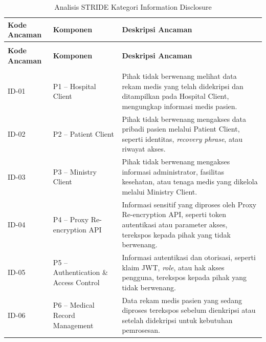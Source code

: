 \begin{xltabular}{\textwidth}{|>{\centering\arraybackslash}p{1.8cm}|>{\raggedright\arraybackslash}p{3.2cm}|X|}
    \caption{Analisis STRIDE Kategori Information Disclosure}
    \label{tab:stride-information-disclosure} \\
    \hline
    \textbf{Kode Ancaman} &
    \textbf{Komponen} &
    \textbf{Deskripsi Ancaman} \\
    \hline
    \endfirsthead

    {} \\
    \hline
    \textbf{Kode Ancaman} &
    \textbf{Komponen} &
    \textbf{Deskripsi Ancaman} \\
    \hline
    \endhead

    \hline
     \\
    \endfoot

    \hline
    \endlastfoot

    ID-01 &
    P1 -- Hospital Client &
    Pihak tidak berwenang melihat data rekam medis yang telah didekripsi dan ditampilkan pada Hospital Client, mengungkap informasi medis pasien. \\
    \hline

    ID-02 &
    P2 -- Patient Client &
    Pihak tidak berwenang mengakses data pribadi pasien melalui Patient Client, seperti identitas, \textit{recovery phrase}, atau riwayat akses. \\
    \hline

    ID-03 &
    P3 -- Ministry Client &
    Pihak tidak berwenang mengakses informasi administrator, fasilitas kesehatan, atau tenaga medis yang dikelola melalui Ministry Client. \\
    \hline

    ID-04 &
    P4 -- Proxy Re-encryption API &
    Informasi sensitif yang diproses oleh Proxy Re-encryption API, seperti token autentikasi atau parameter akses, terekspos kepada pihak yang tidak berwenang. \\
    \hline

    ID-05 &
    P5 -- Authentication \& Access Control &
    Informasi autentikasi dan otorisasi, seperti klaim JWT, \textit{role}, atau hak akses pengguna, terekspos kepada pihak yang tidak berwenang. \\
    \hline

    ID-06 &
    P6 -- Medical Record Management &
    Data rekam medis pasien yang sedang diproses terekspos sebelum dienkripsi atau setelah didekripsi untuk kebutuhan pemrosesan. \\
    \hline


\end{xltabular}
